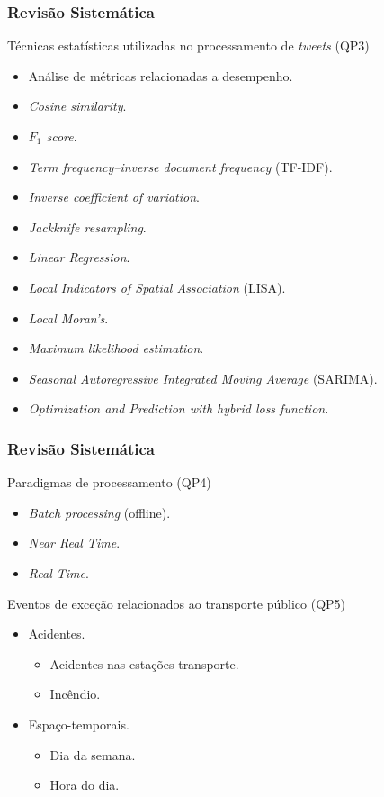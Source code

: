 \documentclass{beamer}
\begin{document}
\begin{frame}
\frametitle{Revisão Sistemática}
\begin{block}{Técnicas estatísticas utilizadas no processamento de \textit{tweets} (QP3)}
\begin{itemize}
\item Análise de métricas relacionadas a desempenho.
\item \textit{Cosine similarity}.
\item \textit{${F_1}$ score}.
\item \textit{Term frequency–inverse document frequency} (TF-IDF).
\item \textit{Inverse coefficient of variation}.
\item \textit{Jackknife resampling}.
\item \textit{Linear Regression}.
\item \textit{Local Indicators of Spatial Association} (LISA).
\item \textit{Local Moran's}.
\item \textit{Maximum likelihood estimation}.
\item \textit{Seasonal Autoregressive Integrated Moving Average} (SARIMA).
\item \textit{Optimization and Prediction with hybrid loss function}.
\end{itemize}
\end{block}
\end{frame}
\begin{frame}
\frametitle{Revisão Sistemática}
\begin{block}{Paradigmas de processamento (QP4)}
\begin{itemize}
\item \textit{Batch processing} (offline).
\item \textit{Near Real Time}.
\item \textit{Real Time}.
\end{itemize}
\end{block}

\begin{block}{Eventos de exceção relacionados ao transporte público (QP5)}
\begin{itemize}
\item Acidentes.
\begin{itemize}
\item Acidentes nas estações transporte.
\item Incêndio.
\end{itemize}

\item Espaço-temporais.
\begin{itemize}
\item Dia da semana.
\item Hora do dia.
\end{itemize}

\end{itemize}
\end{block}

\end{frame}
\end{document}
